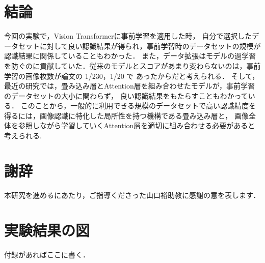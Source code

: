 \documentclass[a4paper, oneside, openany, dvipdfmx]{suribt}%
\begin{document}
\chapter{結論}
今回の実験で，Vision Transformerに事前学習を適用した時，
自分で選択したデータセットに対して良い認識結果が得られ，事前学習時のデータセットの規模が認識結果に関係していることもわかった．
また，データ拡張はモデルの過学習を防ぐのに貢献していた．従来のモデルとスコアがあまり変わらないのは，事前学習の画像枚数が論文の 1/230，1/20 で あったからだと考えられる．
そして，最近の研究では，畳み込み層とAttention層を組み合わせたモデルが，事前学習のデータセットの大小に関わらず， 良い認識結果をもたらすこともわかっている．
このことから，一般的に利用できる規模のデータセットで高い認識精度を得るには，画像認識に特化した局所性を持つ機構である畳み込み層と，
画像全体を参照しながら学習していくAttention層を適切に組み合わせる必要があると考えられる.

\backmatter%
\chapter{謝辞}%
本研究を進めるにあたり，ご指導くださった山口裕助教に感謝の意を表します．


\appendix%
\chapter{実験結果の図}
付録があればここに書く．
\end{document}
